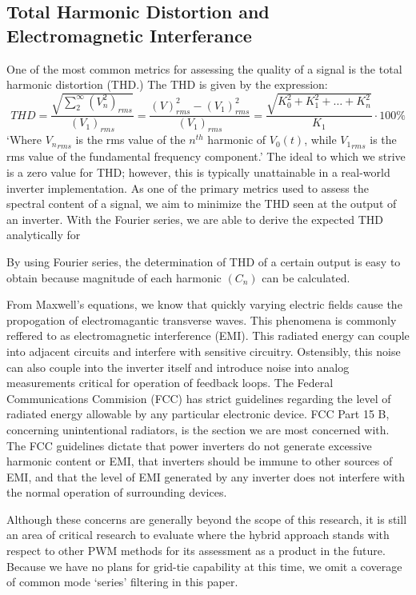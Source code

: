 \subsection{Total Harmonic Distortion and Electromagnetic Interferance}
One of the most common metrics for assessing the quality of a signal is the total harmonic distortion (THD.) The THD is given by the expression:
\begin{equation}
THD=\frac{\sqrt{\sum_{2}^{\infty}(V_n^2)_{rms}}}{(V_1)_{rms}} = \frac{(V)_{rms}^2-(V_1)^2_{rms}}{(V_1)_{rms}} = \frac{\sqrt{K_0^2+K_1^2+\ldots+K_n^2}}{K_1}\cdot100\%
\end{equation} 
`Where ${V_n}_{rms}$ is the rms value of the $n^{th}$ harmonic of $V_0(t)$, while ${V_1}_{rms}$ is the rms value of the fundamental frequency component.'\cite{FourierAnalysis} The ideal to which we strive is a zero value for THD; however, this is typically unattainable in a real-world inverter implementation. As one of the primary metrics used to assess the spectral content of a signal, we aim to minimize the THD seen at the output of an inverter. With the Fourier series, we are able to derive the expected THD analytically for

By using Fourier series, the determination of THD of a certain output is easy to obtain because magnitude of each harmonic $(C_n)$ can be calculated.

From Maxwell's equations, we know that quickly varying electric fields cause the propogation of electromagantic transverse waves. This phenomena is commonly reffered to as electromagnetic interference (EMI). This radiated energy can couple into adjacent circuits and interfere with sensitive circuitry. Ostensibly, this noise can also couple into the inverter itself and introduce noise into analog measurements critical for operation of feedback loops. The Federal Communications Commision (FCC) has strict guidelines regarding the level of radiated energy allowable by any particular electronic device. FCC Part 15 B, concerning unintentional radiators, is the section we are most concerned with.  The FCC guidelines dictate that power inverters do not generate excessive harmonic content or EMI, that inverters should be immune to other sources of EMI, and that the level of EMI generated by any inverter does not interfere with the normal operation of surrounding devices. 

Although these concerns are generally beyond the scope of this research, it is still an area of critical research to evaluate where the hybrid approach stands with respect to other PWM methods for its assessment as a product in the future. Because we have no plans for grid-tie capability at this time, we omit a coverage of common mode `series' filtering in this paper.

